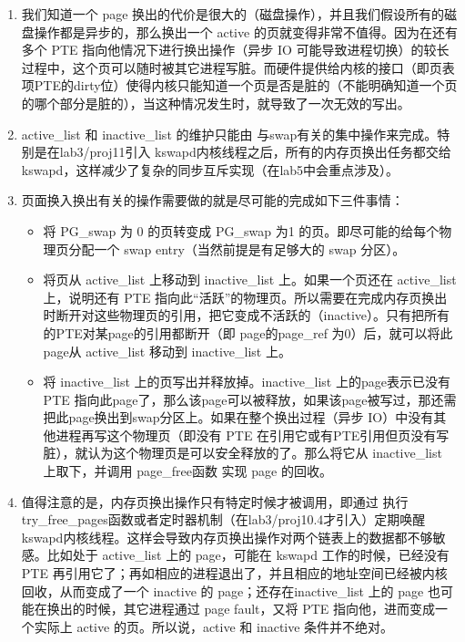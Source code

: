 \begin{enumerate}
\def\labelenumi{\arabic{enumi}.}
\item
  我们知道一个 page
  换出的代价是很大的（磁盘操作），并且我们假设所有的磁盘操作都是异步的，那么换出一个
  active 的页就变得非常不值得。因为在还有多个 PTE
  指向他情况下进行换出操作（异步 IO
  可能导致进程切换）的较长过程中，这个页可以随时被其它进程写脏。而硬件提供给内核的接口（即页表项PTE的dirty位）使得内核只能知道一个页是否是脏的（不能明确知道一个页的哪个部分是脏的），当这种情况发生时，就导致了一次无效的写出。
\item
  active\_list 和 inactive\_list 的维护只能由
  与swap有关的集中操作来完成。特别是在lab3/proj11引入
  kswapd内核线程之后，所有的内存页换出任务都交给kswapd，这样减少了复杂的同步互斥实现（在lab5中会重点涉及）。
\item
  页面换入换出有关的操作需要做的就是尽可能的完成如下三件事情：

  \begin{itemize}
  \item
    将 PG\_swap 为 0 的页转变成 PG\_swap 为1
    的页。即尽可能的给每个物理页分配一个 swap
    entry（当然前提是有足够大的 swap 分区）。
  \item
    将页从 active\_list 上移动到 inactive\_list 上。如果一个页还在
    active\_list 上，说明还有 PTE
    指向此``活跃''的物理页。所以需要在完成内存页换出时断开对这些物理页的引用，把它变成不活跃的（inactive）。只有把所有的PTE对某page的引用都断开（即
    page的page\_ref 为0）后，就可以将此page从 active\_list 移动到
    inactive\_list 上。
  \item
    将 inactive\_list 上的页写出并释放掉。inactive\_list
    上的page表示已没有 PTE
    指向此page了，那么该page可以被释放，如果该page被写过，那还需把此page换出到swap分区上。如果在整个换出过程（异步
    IO）中没有其他进程再写这个物理页（即没有 PTE
    在引用它或有PTE引用但页没有写脏），就认为这个物理页是可以安全释放的了。那么将它从
    inactive\_list 上取下，并调用 page\_free函数 实现 page 的回收。
  \end{itemize}
\item
  值得注意的是，内存页换出操作只有特定时候才被调用，即通过
  执行try\_free\_pages函数或者定时器机制（在lab3/proj10.4才引入）定期唤醒kswapd内核线程。这样会导致内存页换出操作对两个链表上的数据都不够敏感。比如处于
  active\_list 上的 page，可能在 kswapd 工作的时候，已经没有 PTE
  再引用它了；再如相应的进程退出了，并且相应的地址空间已经被内核回收，从而变成了一个
  inactive 的 page；还存在inactive\_list 上的 page
  也可能在换出的时候，其它进程通过 page fault，又将 PTE
  指向他，进而变成一个实际上 active 的页。所以说，active 和 inactive
  条件并不绝对。
\end{enumerate}

